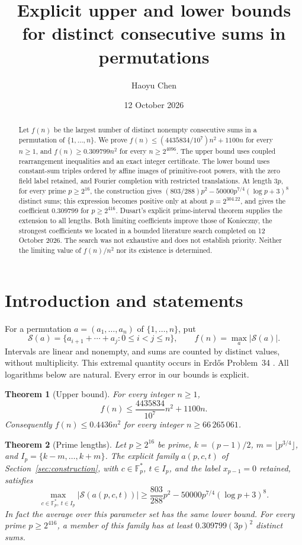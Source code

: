 \documentclass[10pt]{amsart}
\title[Distinct consecutive sums in permutations]{Explicit upper and lower bounds for distinct consecutive sums in permutations}
\author{Haoyu Chen}
\date{12 October 2026}
\newtheorem{theorem}{Theorem}
\theoremstyle{remark}
\newcommand{\Fp}{\mathbb F_p}
\newcommand{\Sset}{\mathcal S}
\begin{document}
\begin{abstract}
Let $f(n)$ be the largest number of distinct nonempty consecutive sums in
a permutation of $\{1,\ldots,n\}$. We prove
$f(n)\le (4435834/10^7)n^2+1100n$ for every $n\ge1$, and
$f(n)\ge0.309799n^2$ for every $n\ge2^{4096}$.
The upper bound uses coupled rearrangement inequalities and an exact
integer certificate. The lower bound uses constant-sum triples ordered
by affine images of primitive-root powers, with the zero field label
retained, and Fourier completion with restricted translations.
At length $3p$, for every prime $p\ge2^{16}$, the construction gives
$(803/288)p^2-50000p^{7/4}(\log p+3)^8$ distinct sums; this expression
becomes positive only at about $p=2^{304.22}$, and gives the coefficient
$0.309799$ for $p\ge2^{416}$. Dusart's explicit prime-interval theorem
supplies the extension to all lengths. Both limiting coefficients
improve those of Konieczny, the strongest coefficients we located in a
bounded literature search completed on 12 October 2026. The search was
not exhaustive and does not establish priority. Neither the limiting
value of $f(n)/n^2$ nor its existence is determined.
\end{abstract}
\maketitle

\section{Introduction and statements}\label{sec:intro}
For a permutation $a=(a_1,\ldots,a_n)$ of $\{1,\ldots,n\}$, put
\[
 \Sset(a)=\{a_{i+1}+\cdots+a_j:0\le i<j\le n\},
 \qquad f(n)=\max_a |\Sset(a)|.
\]
Intervals are linear and nonempty, and sums are counted by distinct
values, without multiplicity. This extremal quantity occurs in
Erd\H{o}s Problem~34 \cite{Bloom}. All logarithms below are natural.
Every error in our bounds is explicit.

\begin{theorem}[Upper bound]\label{thm:upper}
For every integer $n\ge1$,
\[
 f(n)\le\frac{4435834}{10^7}n^2+1100n.
\]
Consequently $f(n)\le0.4436n^2$ for every integer $n\ge66\,265\,061$.
\end{theorem}

\begin{theorem}[Prime lengths]\label{thm:prime}
Let $p\ge2^{16}$ be prime, $k=(p-1)/2$, $m=\lfloor p^{3/4}\rfloor$,
and $I_p=\{k-m,\ldots,k+m\}$. The explicit family $a(p,c,t)$ of
Section~\ref{sec:construction}, with $c\in\Fp^*$, $t\in I_p$, and
the label $x_{p-1}=0$ retained, satisfies
\begin{equation}\label{eq:mainlower}
 \max_{c\in\Fp^*,\ t\in I_p}|\Sset(a(p,c,t))|
 \ge \frac{803}{288}p^2-50000p^{7/4}(\log p+3)^8.
\end{equation}
In fact the average over this parameter set has the same lower bound.
For every prime $p\ge2^{416}$, a member of this family has at least
$0.309799(3p)^2$ distinct sums.
\end{theorem}
\end{document}
